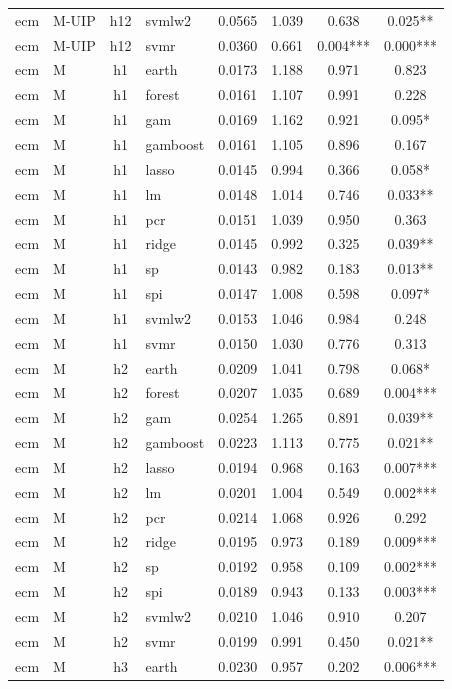 \begin{ThreePartTable}
\begin{longtable}[t]{llclcccc}
ecm & M-UIP & h12 & svmlw2 & 0.0565 & 1.039 & 0.638 & 0.025**\\
ecm & M-UIP & h12 & svmr & 0.0360 & 0.661 & 0.004*** & 0.000***\\
\addlinespace
ecm & M & h1 & earth & 0.0173 & 1.188 & 0.971 & 0.823\\
ecm & M & h1 & forest & 0.0161 & 1.107 & 0.991 & 0.228\\
ecm & M & h1 & gam & 0.0169 & 1.162 & 0.921 & 0.095*\\
ecm & M & h1 & gamboost & 0.0161 & 1.105 & 0.896 & 0.167\\
ecm & M & h1 & lasso & 0.0145 & 0.994 & 0.366 & 0.058*\\
ecm & M & h1 & lm & 0.0148 & 1.014 & 0.746 & 0.033**\\
ecm & M & h1 & pcr & 0.0151 & 1.039 & 0.950 & 0.363\\
ecm & M & h1 & ridge & 0.0145 & 0.992 & 0.325 & 0.039**\\
ecm & M & h1 & sp & 0.0143 & 0.982 & 0.183 & 0.013**\\
ecm & M & h1 & spi & 0.0147 & 1.008 & 0.598 & 0.097*\\
ecm & M & h1 & svmlw2 & 0.0153 & 1.046 & 0.984 & 0.248\\
ecm & M & h1 & svmr & 0.0150 & 1.030 & 0.776 & 0.313\\
\addlinespace
ecm & M & h2 & earth & 0.0209 & 1.041 & 0.798 & 0.068*\\
ecm & M & h2 & forest & 0.0207 & 1.035 & 0.689 & 0.004***\\
ecm & M & h2 & gam & 0.0254 & 1.265 & 0.891 & 0.039**\\
ecm & M & h2 & gamboost & 0.0223 & 1.113 & 0.775 & 0.021**\\
ecm & M & h2 & lasso & 0.0194 & 0.968 & 0.163 & 0.007***\\
ecm & M & h2 & lm & 0.0201 & 1.004 & 0.549 & 0.002***\\
ecm & M & h2 & pcr & 0.0214 & 1.068 & 0.926 & 0.292\\
ecm & M & h2 & ridge & 0.0195 & 0.973 & 0.189 & 0.009***\\
ecm & M & h2 & sp & 0.0192 & 0.958 & 0.109 & 0.002***\\
ecm & M & h2 & spi & 0.0189 & 0.943 & 0.133 & 0.003***\\
ecm & M & h2 & svmlw2 & 0.0210 & 1.046 & 0.910 & 0.207\\
ecm & M & h2 & svmr & 0.0199 & 0.991 & 0.450 & 0.021**\\
\addlinespace
ecm & M & h3 & earth & 0.0230 & 0.957 & 0.202 & 0.006***\\

\end{longtable}
\end{ThreePartTable}

